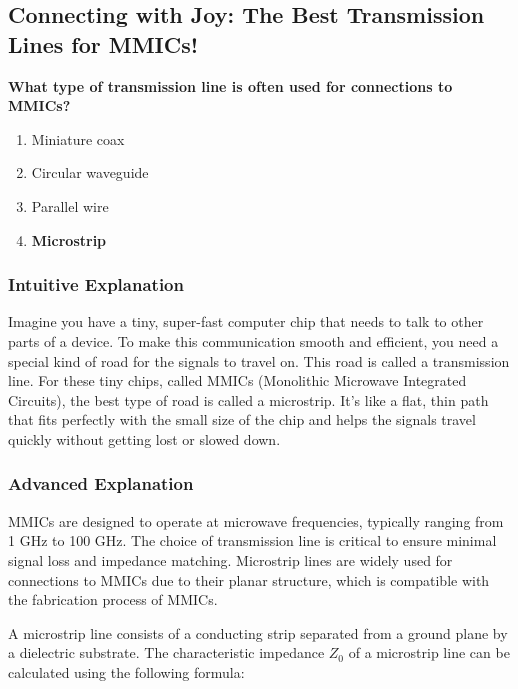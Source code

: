 \subsection{Connecting with Joy: The Best Transmission Lines for MMICs!}
\label{sec:E6E07}

\begin{tcolorbox}[colback=gray!10!white,colframe=black!75!black,title={\textbf{E6E07}}]
\textbf{What type of transmission line is often used for connections to MMICs?}
\begin{enumerate}[label=\Alph*),noitemsep]
    \item Miniature coax
    \item Circular waveguide
    \item Parallel wire
    \item \textbf{Microstrip}
\end{enumerate}
\end{tcolorbox}

\subsubsection{Intuitive Explanation}
Imagine you have a tiny, super-fast computer chip that needs to talk to other parts of a device. To make this communication smooth and efficient, you need a special kind of road for the signals to travel on. This road is called a transmission line. For these tiny chips, called MMICs (Monolithic Microwave Integrated Circuits), the best type of road is called a microstrip. It's like a flat, thin path that fits perfectly with the small size of the chip and helps the signals travel quickly without getting lost or slowed down.

\subsubsection{Advanced Explanation}
MMICs are designed to operate at microwave frequencies, typically ranging from 1 GHz to 100 GHz. The choice of transmission line is critical to ensure minimal signal loss and impedance matching. Microstrip lines are widely used for connections to MMICs due to their planar structure, which is compatible with the fabrication process of MMICs. 

A microstrip line consists of a conducting strip separated from a ground plane by a dielectric substrate. The characteristic impedance \( Z_0 \) of a microstrip line can be calculated using the following formula:

